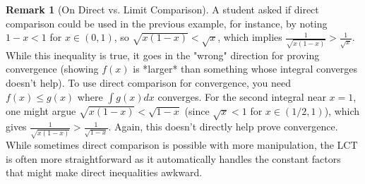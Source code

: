 \documentclass[11pt]{article}
\theoremstyle{definition}
\newtheorem{remark}[theorem]{Remark}
\begin{document}
\begin{remark}[On Direct vs. Limit Comparison]
    A student asked if direct comparison could be used in the previous example, for instance, by noting $1-x < 1$ for $x \in (0, 1)$, so $\sqrt{x(1-x)} < \sqrt{x}$, which implies $\frac{1}{\sqrt{x(1-x)}} > \frac{1}{\sqrt{x}}$. While this inequality is true, it goes in the "wrong" direction for proving convergence (showing $f(x)$ is *larger* than something whose integral converges doesn't help). To use direct comparison for convergence, you need $f(x) \le g(x)$ where $\int g(x) dx$ converges. For the second integral near $x=1$, one might argue $\sqrt{x(1-x)} < \sqrt{1-x}$ (since $\sqrt{x}<1$ for $x \in (1/2, 1)$), which gives $\frac{1}{\sqrt{x(1-x)}} > \frac{1}{\sqrt{1-x}}$. Again, this doesn't directly help prove convergence. While sometimes direct comparison is possible with more manipulation, the LCT is often more straightforward as it automatically handles the constant factors that might make direct inequalities awkward.
\end{remark}
\end{document}
